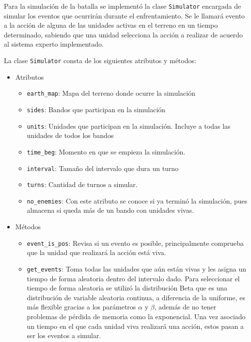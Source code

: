 Para la simulaci\'on de la batalla se implement\'o la clase \verb|Simulator|  encargada de simular los eventos que ocurrir\'an durante el enfrentamiento. Se le llamar\'a evento a la acci\'on de alguna de las unidades activas en el terreno en un tiempo determinado, sabiendo que una unidad selecciona la acci\'on a realizar de acuerdo al sistema experto implementado.

La clase \verb|Simulator| consta de los siguientes atributos y m\'etodos:

\begin{itemize}

\item Atributos
 \begin{itemize}
 \item \verb|earth_map|: Mapa del terreno donde ocurre la simulaci\'on
 
 \item \verb|sides|: Bandos que participan en la simulaci\'on
 
 \item \verb|units|: Unidades que participan en la simulación. Incluye a todas las unidades de todos los bandos
 
 \item \verb|time_beg|: Momento en que se empieza la simulaci\'on.
 
 \item \verb|interval|: Tama\~no del intervalo que dura un turno
 
 \item \verb|turns|: Cantidad de turnos a simular.
 
 \item \verb|no_enemies|: Con este atributo se conoce si ya terminó la simulaci\'on, pues almacena si queda m\'as de un bando con unidades vivas.
 
 \end{itemize}
 \item M\'etodos
 
 \begin{itemize}
 \item \verb|event_is_pos|: Revisa si un evento es posible, principalmente comprueba que la unidad que realizar\'a la acci\'on est\'a viva.
 
 \item \verb|get_events|: Toma todas las unidades que a\'un est\'an vivas y les asigna un tiempo de forma aleatoria dentro del intervalo dado. Para seleccionar el tiempo de forma aleatoria se utiliz\'o la distribuci\'on Beta que es una distribución de variable aleatoria continua, a diferencia de la uniforme, es  m\'as flexible gracias a los par\'ametros $ \alpha $ y $ \beta $, adem\'as de no tener problemas de p\'erdida de memoria como la exponencial. Una vez asociado un tiempo en el que cada unidad viva realizar\'a una acci\'on, estos pasan a ser los eventos a simular.
 

\end{itemize}
\end{itemize}
